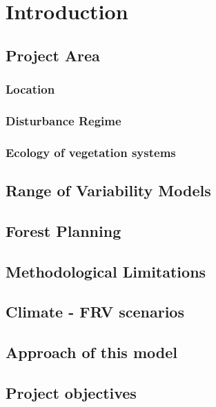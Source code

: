 
\chapter{Introduction} %

\section{Project Area}

\subsection{Location}


\subsection{Disturbance Regime}


\subsection{Ecology of vegetation systems}


\section{Range of Variability Models}


\section{Forest Planning}


\section{Methodological Limitations}


\section{Climate - FRV scenarios}


\section{Approach of this model}


\section{Project objectives}




